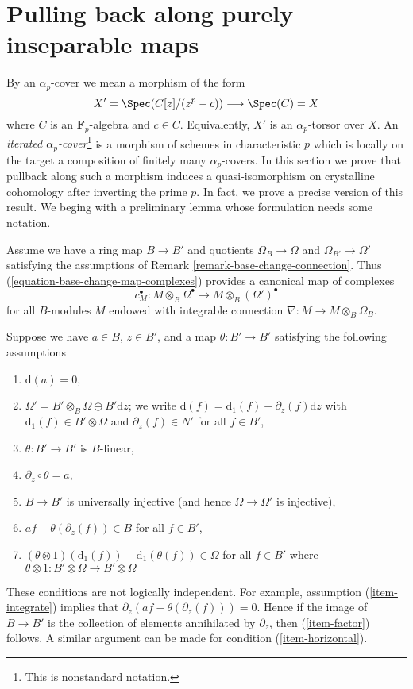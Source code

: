 \section{Pulling back along purely inseparable maps}
\label{section-pull-back-along-pth-root}

\noindent
By an $\alpha_p$-cover we mean a morphism of the form
$$
X' = \Spec(C[z]/(z^p - c)) \longrightarrow \Spec(C) = X
$$
where $C$ is an $\mathbf{F}_p$-algebra and $c \in C$. Equivalently,
$X'$ is an $\alpha_p$-torsor over $X$. An {\it iterated
$\alpha_p$-cover}\footnote{This is nonstandard notation.}
is a morphism of schemes in characteristic
$p$ which is locally on the target a composition of finitely many
$\alpha_p$-covers. In this section we prove that pullback along
such a morphism induces a quasi-isomorphism on crystalline cohomology
after inverting the prime $p$. In fact, we prove a precise version
of this result. We beging with a preliminary lemma whose formulation
needs some notation.

\medskip\noindent
Assume we have a ring map $B \to B'$ and quotients $\Omega_B \to \Omega$ and
$\Omega_{B'} \to \Omega'$ satisfying the assumptions of
Remark \ref{remark-base-change-connection}.
Thus (\ref{equation-base-change-map-complexes}) provides a
canonical map of complexes
$$
c_M^\bullet :
M \otimes_B \Omega^\bullet
\longrightarrow
M \otimes_B (\Omega')^\bullet
$$
for all $B$-modules $M$ endowed with integrable connection
$\nabla : M \to M \otimes_B \Omega_B$.

\medskip\noindent
Suppose we have $a \in B$, $z \in B'$, and a map $\theta : B' \to B'$
satisfying the following assumptions
\begin{enumerate}
\item
\label{item-d-a-zero}
$\text{d}(a) = 0$,
\item
\label{item-direct-sum}
$\Omega' = B' \otimes_B \Omega \oplus B'\text{d}z$; we write
$\text{d}(f) = \text{d}_1(f) + \partial_z(f) \text{d}z$
with $\text{d}_1(f) \in B' \otimes \Omega$ and $\partial_z(f) \in N'$
for all $f \in B'$,
\item
\label{item-theta-linear}
$\theta : B' \to B'$ is $B$-linear,
\item
\label{item-integrate}
$\partial_z \circ \theta = a$,
\item
\label{item-injective}
$B \to B'$ is universally injective (and hence $\Omega \to \Omega'$
is injective),
\item
\label{item-factor}
$af - \theta(\partial_z(f)) \in B$ for all $f \in B'$,
\item
\label{item-horizontal}
$(\theta \otimes 1)(\text{d}_1(f)) - \text{d}_1(\theta(f)) \in \Omega$
for all $f \in B'$ where
$\theta \otimes 1 : B' \otimes \Omega \to B' \otimes \Omega$
\end{enumerate}
These conditions are not logically independent.
For example, assumption (\ref{item-integrate}) implies
that $\partial_z(af - \theta(\partial_z(f))) = 0$.
Hence if the image of $B \to B'$ is the collection of
elements annihilated by $\partial_z$, then (\ref{item-factor})
follows. A similar argument can be made for condition (\ref{item-horizontal}).

